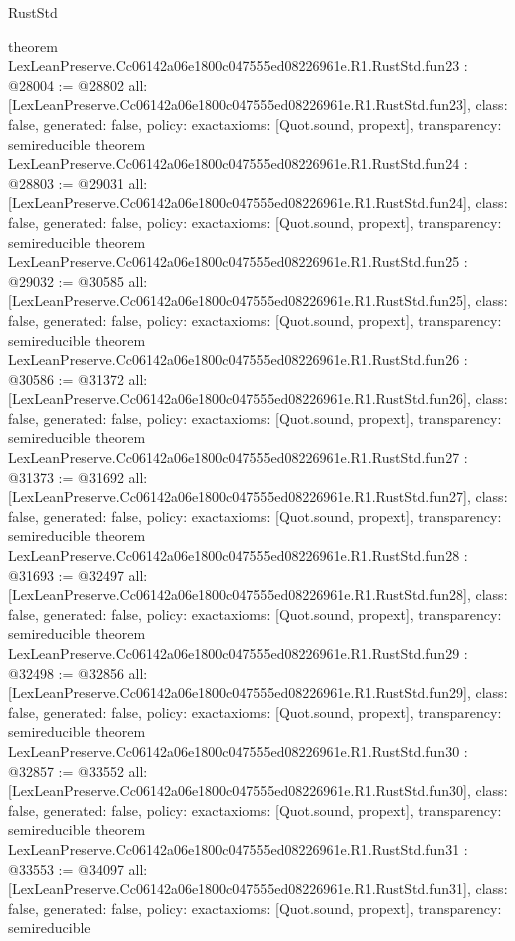 \begin{lexlean}{RustStd}
\begin{coremodule}
{}
theorem LexLeanPreserve.Cc06142a06e1800c047555ed08226961e.R1.RustStd.fun23 : @28004 := @28802 {
  all: [LexLeanPreserve.Cc06142a06e1800c047555ed08226961e.R1.RustStd.fun23],
  class: false,
  generated: false,
  policy: exact{axioms: [Quot.sound, propext]},
  transparency: semireducible
}
theorem LexLeanPreserve.Cc06142a06e1800c047555ed08226961e.R1.RustStd.fun24 : @28803 := @29031 {
  all: [LexLeanPreserve.Cc06142a06e1800c047555ed08226961e.R1.RustStd.fun24],
  class: false,
  generated: false,
  policy: exact{axioms: [Quot.sound, propext]},
  transparency: semireducible
}
theorem LexLeanPreserve.Cc06142a06e1800c047555ed08226961e.R1.RustStd.fun25 : @29032 := @30585 {
  all: [LexLeanPreserve.Cc06142a06e1800c047555ed08226961e.R1.RustStd.fun25],
  class: false,
  generated: false,
  policy: exact{axioms: [Quot.sound, propext]},
  transparency: semireducible
}
theorem LexLeanPreserve.Cc06142a06e1800c047555ed08226961e.R1.RustStd.fun26 : @30586 := @31372 {
  all: [LexLeanPreserve.Cc06142a06e1800c047555ed08226961e.R1.RustStd.fun26],
  class: false,
  generated: false,
  policy: exact{axioms: [Quot.sound, propext]},
  transparency: semireducible
}
theorem LexLeanPreserve.Cc06142a06e1800c047555ed08226961e.R1.RustStd.fun27 : @31373 := @31692 {
  all: [LexLeanPreserve.Cc06142a06e1800c047555ed08226961e.R1.RustStd.fun27],
  class: false,
  generated: false,
  policy: exact{axioms: [Quot.sound, propext]},
  transparency: semireducible
}
theorem LexLeanPreserve.Cc06142a06e1800c047555ed08226961e.R1.RustStd.fun28 : @31693 := @32497 {
  all: [LexLeanPreserve.Cc06142a06e1800c047555ed08226961e.R1.RustStd.fun28],
  class: false,
  generated: false,
  policy: exact{axioms: [Quot.sound, propext]},
  transparency: semireducible
}
theorem LexLeanPreserve.Cc06142a06e1800c047555ed08226961e.R1.RustStd.fun29 : @32498 := @32856 {
  all: [LexLeanPreserve.Cc06142a06e1800c047555ed08226961e.R1.RustStd.fun29],
  class: false,
  generated: false,
  policy: exact{axioms: [Quot.sound, propext]},
  transparency: semireducible
}
theorem LexLeanPreserve.Cc06142a06e1800c047555ed08226961e.R1.RustStd.fun30 : @32857 := @33552 {
  all: [LexLeanPreserve.Cc06142a06e1800c047555ed08226961e.R1.RustStd.fun30],
  class: false,
  generated: false,
  policy: exact{axioms: [Quot.sound, propext]},
  transparency: semireducible
}
theorem LexLeanPreserve.Cc06142a06e1800c047555ed08226961e.R1.RustStd.fun31 : @33553 := @34097 {
  all: [LexLeanPreserve.Cc06142a06e1800c047555ed08226961e.R1.RustStd.fun31],
  class: false,
  generated: false,
  policy: exact{axioms: [Quot.sound, propext]},
  transparency: semireducible
}
\end{coremodule}
\end{lexlean}
